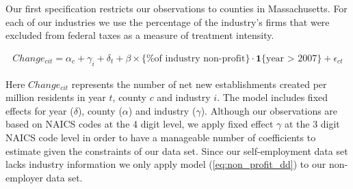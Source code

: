 \documentclass[12pt]{article}
\begin{document}
Our first specification restricts our observations to counties in Massachusetts. For each of our industries we use the percentage of the industry's firms that were excluded from federal taxes as a measure of treatment intensity. 
\begin{comment}

We interpret our coefficient of interest as a lower bound estimate of the health care shock impact. It is a lower bound because for-profit industries may have also benefited and we are measuring the difference between the two sets of industries.

\begin{align}
Change_{cit} = \alpha_c + \gamma_i + \delta_t + \beta \, \mathbf{1}\{\text{non-profit industry}\} \cdot \mathbf{1}\{\text{year > 2007}\} + \epsilon_{ct}
\end{align}

\begin{align}
Change_{cit} = & \; \gamma_i \cdot \alpha_c + \gamma_i \cdot \delta_t +  \alpha_c \cdot \delta_t \nonumber   \\
& + \beta \, \mathbf{1}\{\text{non-profit industry}\} \cdot \mathbf{1}\{\text{year > 2007}\}  \cdot \mathbf{1}\{\text{county in  MA}\} \nonumber  \\
& + \epsilon_{ict}
\end{align}

\end{comment}
\begin{align} \label{eq:non_profit_dd}
Change_{cit} = \alpha_c + \gamma_i + \delta_t + \beta \times \{\text{\% of industry non-profit}\} \cdot \mathbf{1}\{\text{year > 2007}\} + \epsilon_{ct}
\end{align}

Here $Change_{cit}$ represents the number of net new establishments created per million residents in year $t$, county $c$ and industry $i$. The model includes fixed effects for year ($\delta$), county ($\alpha$) and industry ($\gamma$). Although our observations are based on NAICS codes at the 4 digit level, we apply fixed effect $\gamma$ at the 3 digit NAICS code level in order to have a manageable number of coefficients to estimate given the constraints of our data set. Since our self-employment data set lacks industry information we only apply model (\ref{eq:non_profit_dd}) to our non-employer data set. 
\end{document}

